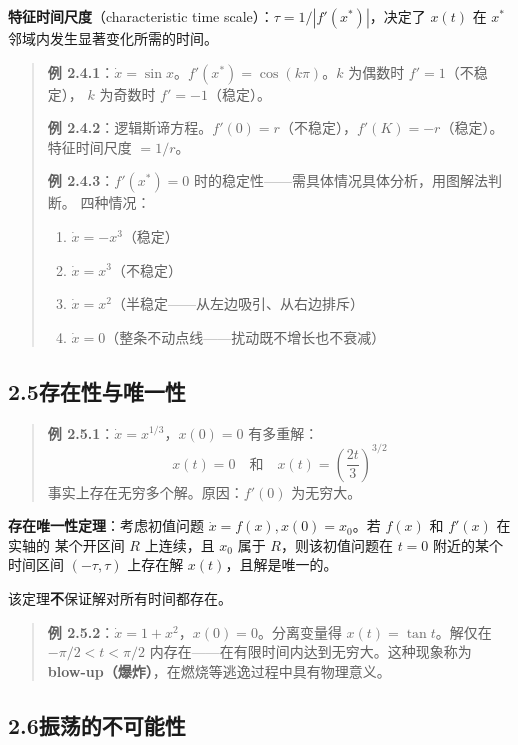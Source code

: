 \documentclass[12pt,a4paper]{article}
\begin{document}
\textbf{特征时间尺度}（characteristic time scale）：$\tau = 1/|f'(x^*)|$，决定了 $x(t)$ 在 $x^*$
邻域内发生显著变化所需的时间。

\begin{quote}
\textbf{例 2.4.1}：$\dot{x} = \sin x$。$f'(x^*) = \cos(k\pi)$。$k$ 为偶数时 $f' = 1$（不稳定），
$k$ 为奇数时 $f' = -1$（稳定）。

\medskip
\textbf{例 2.4.2}：逻辑斯谛方程。$f'(0) = r$（不稳定），$f'(K) = -r$（稳定）。
特征时间尺度 $= 1/r$。

\medskip
\textbf{例 2.4.3}：$f'(x^*) = 0$ 时的稳定性——需具体情况具体分析，用图解法判断。
四种情况：
\begin{enumerate}[label=(\alph*),nosep]
  \item $\dot{x} = -x^3$（稳定）
  \item $\dot{x} = x^3$（不稳定）
  \item $\dot{x} = x^2$（半稳定——从左边吸引、从右边排斥）
  \item $\dot{x} = 0$（整条不动点线——扰动既不增长也不衰减）
\end{enumerate}
\end{quote}

\subsection{2.5\quad 存在性与唯一性}

\begin{quote}
\textbf{例 2.5.1}：$\dot{x} = x^{1/3}$，$x(0) = 0$ 有多重解：
\[
x(t) = 0 \quad\text{和}\quad x(t) = \left(\frac{2t}{3}\right)^{3/2}
\]
事实上存在无穷多个解。原因：$f'(0)$ 为无穷大。
\end{quote}

\textbf{存在唯一性定理}：考虑初值问题 $\dot{x} = f(x), x(0) = x_0$。若 $f(x)$ 和 $f'(x)$ 在实轴的
某个开区间 $R$ 上连续，且 $x_0$ 属于 $R$，则该初值问题在 $t = 0$ 附近的某个时间区间
$(-\tau, \tau)$ 上存在解 $x(t)$，且解是唯一的。

该定理\textbf{不}保证解对所有时间都存在。

\begin{quote}
\textbf{例 2.5.2}：$\dot{x} = 1 + x^2$，$x(0) = 0$。分离变量得 $x(t) = \tan t$。解仅在
$-\pi/2 < t < \pi/2$ 内存在——在有限时间内达到无穷大。这种现象称为
\textbf{blow-up（爆炸）}，在燃烧等逃逸过程中具有物理意义。
\end{quote}

\subsection{2.6\quad 振荡的不可能性}
\end{document}
